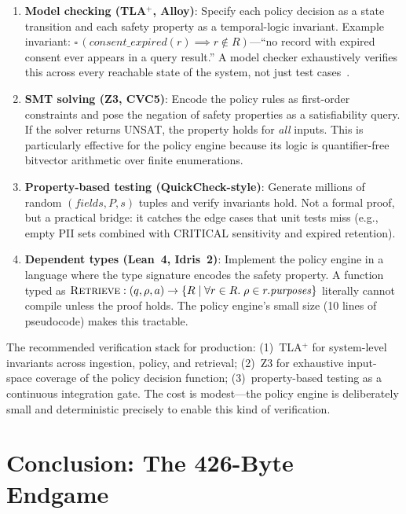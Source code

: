 \documentclass[11pt,twocolumn]{article}
\begin{document}
\begin{enumerate}[nosep,leftmargin=1.5em]
  \item \textbf{Model checking (TLA$^+$, Alloy)}: Specify each policy decision as a state transition and each safety property as a temporal-logic invariant. Example invariant: $\square\,(\mathit{consent\_expired}(r) \implies r \notin R)$---``no record with expired consent ever appears in a query result.'' A model checker exhaustively verifies this across every reachable state of the system, not just test cases~\cite{lamport2002}.
  \item \textbf{SMT solving (Z3, CVC5)}: Encode the policy rules as first-order constraints and pose the negation of safety properties as a satisfiability query. If the solver returns UNSAT, the property holds for \emph{all} inputs. This is particularly effective for the policy engine because its logic is quantifier-free bitvector arithmetic over finite enumerations.
  \item \textbf{Property-based testing (QuickCheck-style)}: Generate millions of random $(\mathit{fields}, P, s)$ tuples and verify invariants hold. Not a formal proof, but a practical bridge: it catches the edge cases that unit tests miss (e.g., empty PII sets combined with CRITICAL sensitivity and expired retention).
  \item \textbf{Dependent types (Lean~4, Idris~2)}: Implement the policy engine in a language where the type signature encodes the safety property. A function typed as $\textsc{Retrieve} : (q, \rho, a) \rightarrow \{R \mid \forall r \in R.\; \rho \in r.\mathit{purposes}\}$ literally cannot compile unless the proof holds. The policy engine's small size (10 lines of pseudocode) makes this tractable.
\end{enumerate}

The recommended verification stack for production: (1)~TLA$^+$ for system-level invariants across ingestion, policy, and retrieval; (2)~Z3 for exhaustive input-space coverage of the policy decision function; (3)~property-based testing as a continuous integration gate. The cost is modest---the policy engine is deliberately small and deterministic precisely to enable this kind of verification.

\section{Conclusion: The 426-Byte Endgame}
\end{document}
